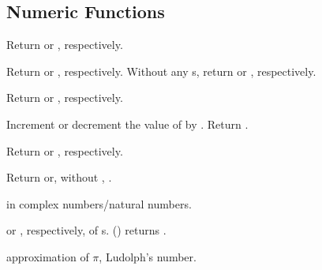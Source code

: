 \subsection{Numeric Functions}

\begin{LIST}{1cm}

  {
  Return  or , respectively.
  }

  {
  Return  or , respectively. Without any
  s, return  or , respectively.
  }

  {Return  or
  , respectively.
  }

  {
  Increment or decrement the value of  by . Return .
  }

     {
       Return  or , respectively.
     }

  {
    Return  or,
    without , .
  }

  {
     in complex numbers/natural numbers.
  }

  {
   or , respectively, of s. ()
  returns .
  }

  {
   approximation of $\pi$, Ludolph's number.
  }


\end{LIST}
